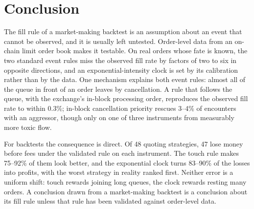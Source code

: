 \section{Conclusion}
\label{sec:conclusion}

The fill rule of a market-making backtest is an assumption about an event that
cannot be observed, and it is usually left untested. Order-level data from an
on-chain limit order book makes it testable. On real orders whose fate is known,
the two standard event rules miss the observed fill rate by factors of two to
six in opposite directions, and an exponential-intensity clock is set by its
calibration rather than by the data. One mechanism explains both event rules:
almost all of the queue in front of an order leaves by cancellation. A rule that
follows the queue, with the exchange's in-block processing order, reproduces the
observed fill rate to within 0.3\%; in-block cancellation priority rescues 3--4\%
of encounters with an aggressor, though only on one of three instruments from
measurably more toxic flow.

For backtests the consequence is direct. Of 48 quoting strategies, 47 lose money
before fees under the validated rule on each instrument. The touch rule makes
75--92\% of them look better, and the exponential clock turns 83--90\% of the
losses into profits, with the worst strategy in reality ranked first. Neither
error is a uniform shift: touch rewards joining long queues, the clock rewards
resting many orders. A conclusion drawn from a market-making backtest is a
conclusion about its fill rule unless that rule has been validated against
order-level data.
